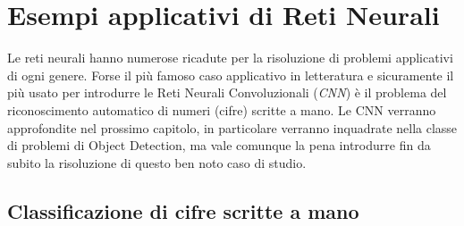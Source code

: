 \documentclass[12pt,a4paper,openright,twoside]{report}
\begin{document}
\section{Esempi applicativi di Reti Neurali}
Le reti neurali hanno numerose ricadute per la risoluzione di problemi applicativi di ogni genere.
Forse il più famoso caso applicativo in letteratura e sicuramente il più usato per introdurre le Reti Neurali Convoluzionali (\emph{CNN}) è il problema del riconoscimento automatico di numeri (cifre) scritte a mano. 
Le CNN verranno approfondite nel prossimo capitolo, in particolare verranno inquadrate nella classe di problemi di Object Detection, ma vale comunque la pena introdurre fin da subito la risoluzione di questo ben noto caso di studio. 
\subsection{Classificazione di cifre scritte a mano}
\end{document}
